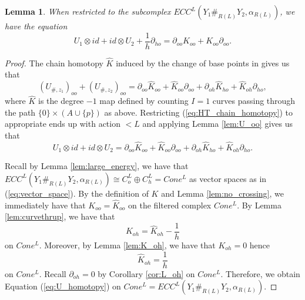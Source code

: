 \documentclass{article}
\numberwithin{equation}{section}
\newtheorem{lemma}[theorem]{Lemma}
\theoremstyle{definition}
\begin{document}
\begin{lemma}
\label{lem:umaphomotopy}
When restricted to the subcomplex $ECC^L(Y_1 \#_{R(L)} Y_2, \alpha_{R(L)})$, we have the equation 
\begin{equation}
\label{eq:U_homotopy}
    U_1 \otimes id + id \otimes U_2 + \frac{1}{h} \partial_{ho} = \partial_{oo} K_{oo} + K_{oo}\partial_{oo}.
\end{equation}
\end{lemma}
\begin{proof}
The chain homotopy $\widehat{K}$ induced by the change of base points in \cite{HT_weinstein} gives us that 
\begin{equation}
\label{eq:HT_chain_homotopy}
    (U_{\#, z_1})_{oo} + (U_{\#, z_2})_{oo}= \partial_{oo} \widehat{K}_{oo} + \widehat{K}_{oo}\partial_{oo} + \partial_{oh}\widehat{K}_{ho} + \widehat{K}_{oh}\partial_{ho},
\end{equation}
where $\widehat{K}$ is the degree $-1$ map defined by counting $I = 1$ curves passing through the path $\{0\} \times (A \cup \{p\})$ as above. Restricting (\ref{eq:HT_chain_homotopy}) to appropriate ends up with action $< L$ and applying Lemma \ref{lem:U_oo} gives us that
\begin{equation}
\label{eq:HT_filtered_chain_homotopy}
    U_1 \otimes id + id \otimes U_2= \partial_{oo} \widehat{K}_{oo} + \widehat{K}_{oo}\partial_{oo} + \partial_{oh}\widehat{K}_{ho} + \widehat{K}_{oh}\partial_{ho}.
\end{equation}

Recall by Lemma \ref{lem:large_energy}, we have that $ECC^L(Y_1 \#_{R(L)} Y_2, \alpha_{R(L)}) \cong C_o^L \oplus C_h^L = Cone^L$ as vector spaces as in (\ref{eq:vector_space}). By the definition of $K$ and Lemma \ref{lem:no_crossing}, we immediately have that $K_{oo} = \widehat{K}_{oo}$ on the filtered complex $Cone^L$. By Lemma \ref{lem:curvethrup}, we have that 
$$K_{oh} = \widehat{K}_{oh} - \frac{1}{h}$$
on $Cone^L$. Moreover, by Lemma \ref{lem:K_oh}, we have that $K_{oh} = 0$ hence 
$$\widehat{K}_{oh} = \frac{1}{h}$$ on $Cone^L$. Recall $\partial_{oh} = 0$ by Corollary \ref{cor:L_oh} on $Cone^L$. Therefore, we obtain Equation (\ref{eq:U_homotopy}) on $Cone^L = ECC^L(Y_1 \#_{R(L)} Y_2, \alpha_{R(L)})$.
\end{proof}
\end{document}
